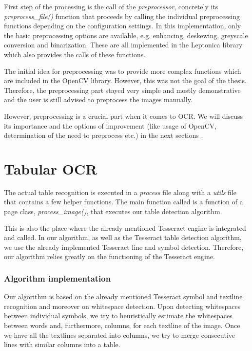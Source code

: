 First step of the processing is the call of the \emph{preprocessor}, concretely its \emph{preprocess\_file()} function that proceeds by calling the individual preprocessing functions depending on the configuration settings. In this implementation, only the basic preprocessing options are available, e.g. enhancing, deskewing, greyscale conversion and binarization. These are all implemented in the Leptonica library which also provides the calls of these functions. 

The initial idea for preprocessing was to provide more complex functions which are included in the OpenCV library. However, this was not the goal of the thesis. Therefore, the preprocessing part stayed very simple and mostly demonstrative and the user is still advised to preprocess the images manually.

However, preprocessing is a crucial part when it comes to OCR. We will discuss its importance and the options of improvement (like usage of OpenCV, determination of the need to preprocess etc.) in the next sections . 

\section{Tabular OCR}

The actual table recognition is executed in a \emph{process} file along with a \emph{utils} file that contains a few helper functions. The main function called is a function of a page class, \emph{process\_image()}, that executes our table detection algorithm.

This is also the place where the already mentioned Tesseract engine is integrated and called. In our algorithm, as well as the Tesseract table detection algorithm, we use the already implemented Tesseract line and symbol detection. Therefore, our algorithm relies greatly on the functioning of the Tesseract engine. 


\subsubsection{Algorithm implementation}

Our algorithm is based on the already mentioned Tesseract symbol and textline recognition and moreover on whitespace detection. Upon detecting whitespaces between individual symbols, we try to heuristically estimate the whitespaces between words and, furthermore, columns, for each textline of the image. Once we have all the textlines separated into columns, we try to merge consecutive lines with similar columns into a table.  

